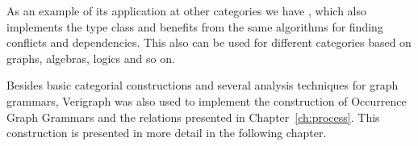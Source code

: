 As an example of its application at other categories we have , which also implements the  type class and benefits from the same algorithms for finding conflicts and dependencies. This also can be used for different categories based on graphs, algebras, logics and so on.

Besides basic categorial constructions and several analysis techniques for graph grammars, Verigraph was also used to implement the construction of Occurrence Graph Grammars and the relations presented in Chapter~\ref{ch:process}. This construction is presented in more detail in the following chapter.


